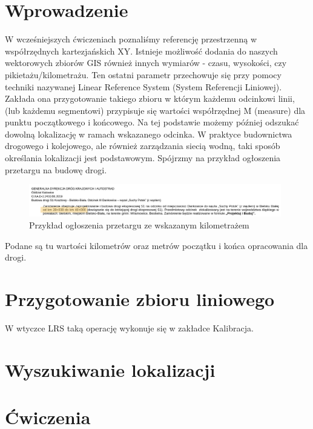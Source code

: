 \documentclass[a4paper,11pt, onecolumn, openany]{memoir}
\begin{document}
		\section{Wprowadzenie}
		W wcześniejszych ćwiczeniach poznaliśmy referencję przestrzenną w współrzędnych kartezjańskich XY. Istnieje możliwość dodania do naszych wektorowych zbiorów GIS również innych wymiarów - czasu, wysokości, czy pikietażu/kilometrażu. Ten ostatni parametr przechowuje się przy pomocy techniki nazywanej Linear Reference System (System Referencji Liniowej). Zakłada ona przygotowanie takiego zbioru w którym każdemu odcinkowi linii, (lub każdemu segmentowi) przypisuje się wartości współrzędnej M (measure) dla punktu początkowego i końcowego. Na tej podstawie możemy później odszukać dowolną lokalizację w ramach wskazanego odcinka. W praktyce budownictwa drogowego i kolejowego, ale również zarządzania siecią wodną, taki sposób określania lokalizacji jest podstawowym. Spójrzmy na przykład ogłoszenia przetargu na budowę drogi. 
		\begin{figure}[!ht]
			\centering
			\includegraphics[width=11cm]{lrs-ogloszenie}
			\caption{Przykład ogłoszenia przetargu ze wskazanym kilometrażem}
		\end{figure}
	Podane są tu wartości kilometrów oraz metrów początku i końca opracowania dla drogi. 
		\section{Przygotowanie zbioru liniowego}
		 W wtyczce LRS taką operację wykonuje się w zakładce Kalibracja.  
		\section{Wyszukiwanie lokalizacji}
		\section{Ćwiczenia}
\end{document}
